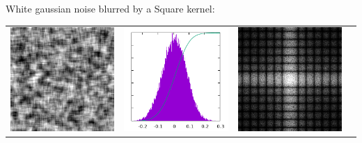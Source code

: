 

White gaussian noise blurred by a Square kernel:

\begin{tabular}{cccc}
	\includegraphics{s256.png} &
	\includegraphics{s256_h.png} &
	\includegraphics{s256_f.png} &

\end{tabular}
